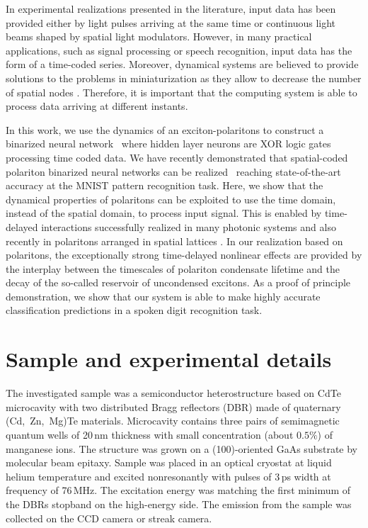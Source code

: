 \documentclass[
 print,
 amsmath,amssymb,
 aps,
]{revtex4-2}
\begin{document}
	In experimental realizations presented in the literature, input data has been provided either by light pulses arriving at the same time or continuous light beams shaped by spatial light modulators. However, in many practical applications, such as signal processing or speech recognition, input data has the form of a time-coded series. Moreover, dynamical systems are believed to provide solutions to the problems in miniaturization as they allow to decrease the number of spatial nodes \cite{Appeltant_ncomm}. Therefore, it is important that the computing system is able to process data arriving at different instants. 
	
	In this work, we use the dynamics of an exciton-polaritons to construct a binarized neural network~\cite{Bengio_Binarized, Rastegari} where hidden layer neurons are XOR logic gates processing time coded data. We have recently demonstrated that spatial-coded polariton binarized neural networks can be realized~\cite{Mirek_XOR} reaching state-of-the-art accuracy at the MNIST pattern recognition task. Here, we show that the dynamical properties of polaritons can be exploited to use the time domain, instead of the spatial domain, to process input signal. This is enabled by time-delayed interactions successfully realized in many photonic systems \cite{Brunner_NatComm, Feldmann_AllOpticalSpikingNetwork, Hurtado_SciRep} and also recently in polaritons arranged in spatial lattices \cite{Pavlos_timedelay}. In our realization based on polaritons, the exceptionally strong time-delayed nonlinear effects are provided by the interplay between the timescales of polariton condensate lifetime and the decay of the so-called reservoir of uncondensed excitons. As a proof of principle demonstration, we show that our system is able to make highly accurate classification predictions in a spoken digit recognition task.
	
	\section{\label{sec:exp_details}Sample and experimental details}
	The investigated sample was a semiconductor heterostructure based on CdTe microcavity with two distributed Bragg reflectors (DBR) made of quaternary \mbox{(Cd, Zn, Mg)Te} materials. Microcavity contains three pairs of semimagnetic quantum wells of 20\,nm thickness with small concentration (about $0.5\%$) of manganese ions. The structure was grown on a (100)-oriented GaAs substrate by molecular beam epitaxy. Sample was placed in an optical cryostat at liquid helium temperature and excited nonresonantly with pulses of 3\,ps width at frequency of 76\,MHz. The excitation energy was matching the first minimum of the DBRs stopband on the high-energy side. The emission from the sample was collected on the CCD camera or streak camera.
\end{document}
